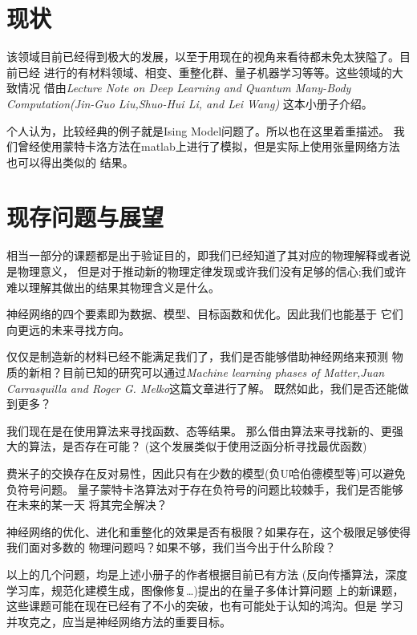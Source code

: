 \documentclass[UTF8,a4paper,10pt]{ctexart}
\begin{document}
\section{现状}
该领域目前已经得到极大的发展，以至于用现在的视角来看待都未免太狭隘了。目前已经
进行的有材料领域、相变、重整化群、量子机器学习等等。这些领域的大致情况
借由\emph{Lecture Note on Deep Learning and Quantum Many-Body Computation(Jin-Guo Liu,Shuo-Hui Li, and Lei Wang)}
这本小册子介绍。\newline

个人认为，比较经典的例子就是Ising Model问题了。所以也在这里着重描述。
我们曾经使用蒙特卡洛方法在matlab上进行了模拟，但是实际上使用张量网络方法也可以得出类似的
结果。\newline



\section{现存问题与展望}
相当一部分的课题都是出于验证目的，即我们已经知道了其对应的物理解释或者说是物理意义，
但是对于推动新的物理定律发现或许我们没有足够的信心;我们或许难以理解其做出的结果其物理含义是什么。\newline

神经网络的四个要素即为数据、模型、目标函数和优化。因此我们也能基于
它们向更远的未来寻找方向。\newline

仅仅是制造新的材料已经不能满足我们了，我们是否能够借助神经网络来预测
物质的新相？目前已知的研究可以通过\emph{Machine learning phases of Matter,Juan Carrasquilla and Roger G. Melko}这篇文章进行了解。
既然如此，我们是否还能做到更多？ \newline

我们现在是在使用算法来寻找函数、态等结果。
那么借由算法来寻找新的、更强大的算法，是否存在可能？
(这个发展类似于使用泛函分析寻找最优函数) \newline

费米子的交换存在反对易性，因此只有在少数的模型(负U哈伯德模型等)可以避免负符号问题。
量子蒙特卡洛算法对于存在负符号的问题比较棘手，我们是否能够在未来的某一天
将其完全解决？\newline

神经网络的优化、进化和重整化的效果是否有极限？如果存在，这个极限足够使得我们面对多数的
物理问题吗？如果不够，我们当今出于什么阶段？\newline

以上的几个问题，均是上述小册子的作者根据目前已有方法
(反向传播算法，深度学习库，规范化建模生成，图像修复\dots)提出的在量子多体计算问题
上的新课题，这些课题可能在现在已经有了不小的突破，也有可能处于认知的鸿沟。但是
学习并攻克之，应当是神经网络方法的重要目标。\newline
\end{document}

